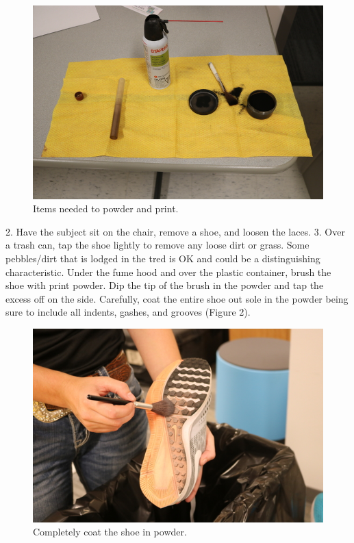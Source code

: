 \begin{figure}[!htp]
\centering
\includegraphics[scale=0.3]{Powder_Stuff}
\caption{Items needed to powder and print.}
\label{Image 1}
\end{figure}

2.	Have the subject sit on the chair, remove a shoe, and loosen the laces.  
3.	Over a trash can, tap the shoe lightly to remove any loose dirt or grass. Some pebbles/dirt that is lodged in the tred is OK and could be a distinguishing characteristic. Under the fume hood and over the plastic container, brush the shoe with print powder. Dip the tip of the brush in the powder and tap the excess off on the side. Carefully, coat the entire shoe out sole in the powder being sure to include all indents, gashes, and grooves (Figure 2).  

\begin{figure}[!htp]
\centering
\includegraphics[scale=0.5]{Powder_Brush}
\caption{Completely coat the shoe in powder.}
\label{Image 2}
\end{figure}

